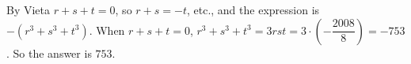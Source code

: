 By Vieta $r+s+t=0$, so $r+s=-t$, etc., and the expression is $-(r^3+s^3+t^3)$. When $r+s+t=0$, $r^3+s^3+t^3=3rst=3\cdot\left(-\dfrac{2008}8\right)=-753$. So the answer is $\boxed{753}$.
